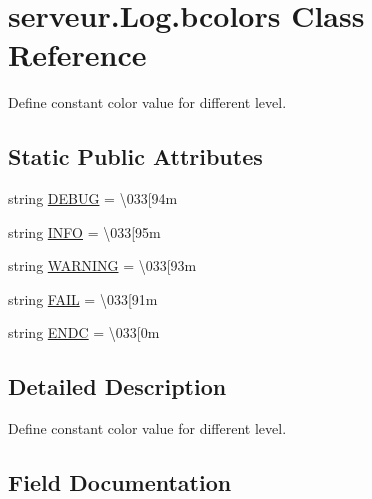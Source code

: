 \hypertarget{classserveur_1_1_log_1_1bcolors}{}\section{serveur.\+Log.\+bcolors Class Reference}
\label{classserveur_1_1_log_1_1bcolors}


Define constant color value for different level.  


\subsection*{Static Public Attributes}
\begin{DoxyCompactItemize}
\item 
string \hyperlink{classserveur_1_1_log_1_1bcolors_a7c7aedf9b264a1a8d42acd65427b616e}{D\+E\+B\+U\+G} = \textquotesingle{}\textbackslash{}033\mbox{[}94m \textquotesingle{}
\item 
string \hyperlink{classserveur_1_1_log_1_1bcolors_afb7400aaf3ca13b35ad23f1cfed64115}{I\+N\+F\+O} = \textquotesingle{} \textbackslash{}033\mbox{[}95m \textquotesingle{}
\item 
string \hyperlink{classserveur_1_1_log_1_1bcolors_ae706a7991852f73775de2e14ad7e19e4}{W\+A\+R\+N\+I\+N\+G} = \textquotesingle{} \textbackslash{}033\mbox{[}93m \textquotesingle{}
\item 
string \hyperlink{classserveur_1_1_log_1_1bcolors_a024a254ec6ea460794a439910ece8e2a}{F\+A\+I\+L} = \textquotesingle{} \textbackslash{}033\mbox{[}91m \textquotesingle{}
\item 
string \hyperlink{classserveur_1_1_log_1_1bcolors_a7d110dd4954d5f69010d40508641e087}{E\+N\+D\+C} = \textquotesingle{} \textbackslash{}033\mbox{[}0m \textquotesingle{}
\end{DoxyCompactItemize}


\subsection{Detailed Description}
Define constant color value for different level. 

\subsection{Field Documentation}
\hypertarget{classserveur_1_1_log_1_1bcolors_a7c7aedf9b264a1a8d42acd65427b616e}{}
